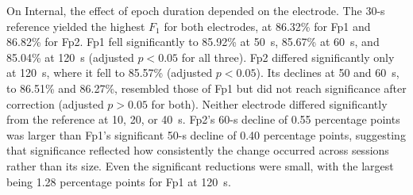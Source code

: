 On Internal, the effect of epoch duration depended on the electrode. The 30-s reference yielded the highest $F_1$ for both electrodes, at 86.32\% for Fp1 and 86.82\% for Fp2. Fp1 fell significantly to 85.92\% at 50~s, 85.67\% at 60~s, and 85.04\% at 120~s (adjusted $p < 0.05$ for all three). Fp2 differed significantly only at 120~s, where it fell to 85.57\% (adjusted $p < 0.05$). Its declines at 50 and 60~s, to 86.51\% and 86.27\%, resembled those of Fp1 but did not reach significance after correction (adjusted $p > 0.05$ for both). Neither electrode differed significantly from the reference at 10, 20, or 40~s. Fp2's 60-s decline of 0.55 percentage points was larger than Fp1's significant 50-s decline of 0.40 percentage points, suggesting that significance reflected how consistently the change occurred across sessions rather than its size. Even the significant reductions were small, with the largest being 1.28 percentage points for Fp1 at 120~s.
